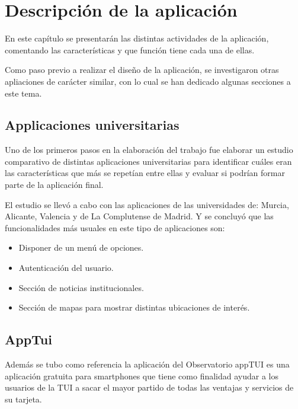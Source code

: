 %
%
%
%

\cleardoublepage

\chapter{Descripción de la aplicación}
En este capítulo se presentarán las distintas actividades de la aplicación, comentando las características y que función tiene cada una de ellas.

Como paso previo a realizar el diseño de la aplicación, se investigaron otras 
apliaciones de carácter similar, con lo cual se han dedicado algunas secciones a este tema.

\section{Applicaciones universitarias}

Uno de los primeros pasos en la elaboración del trabajo fue elaborar un estudio comparativo de distintas aplicaciones universitarias para identificar cuáles eran las características que más se repetían entre ellas y evaluar si podrían formar parte de la aplicación final. 

El estudio se llevó a cabo con las aplicaciones de las universidades de: Murcia, 
Alicante, Valencia y de La Complutense de Madrid. Y se concluyó que las funcionalidades más usuales en este tipo de aplicaciones son:

\begin{itemize}
\item Disponer de un menú de opciones.
\item Autenticación del usuario.
\item Sección de noticias institucionales.
\item Sección de mapas para mostrar distintas ubicaciones de interés.
\end{itemize}

\section{AppTui}

Además se tubo como referencia la aplicación del Observatorio appTUI \cite{URL::appTUI} 
es una aplicación gratuita para smartphones 
que tiene como finalidad ayudar a los usuarios de la TUI a sacar el mayor partido de 
todas las ventajas y servicios de su tarjeta. 

